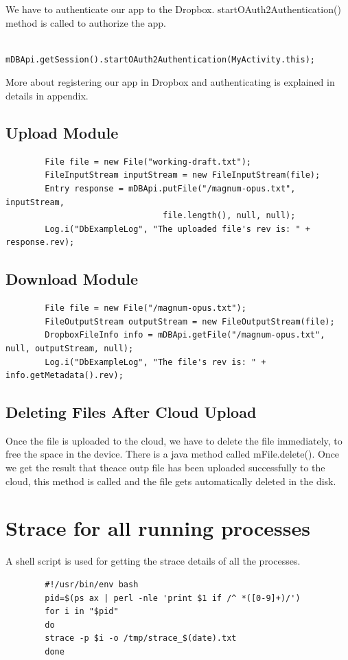 \documentclass[12pt]{report}
\begin{document}
We have to authenticate our app to the Dropbox. startOAuth2Authentication() method is called to authorize the app.

\begin{lstlisting}
        mDBApi.getSession().startOAuth2Authentication(MyActivity.this);
\end{lstlisting}

More about registering our app in Dropbox and authenticating is explained in details in appendix.
\subsection{Upload Module}

\begin{lstlisting}
        File file = new File("working-draft.txt");
        FileInputStream inputStream = new FileInputStream(file);
        Entry response = mDBApi.putFile("/magnum-opus.txt", inputStream,
                                file.length(), null, null);
        Log.i("DbExampleLog", "The uploaded file's rev is: " + response.rev);

\end{lstlisting}
\subsection{Download Module}
\begin{lstlisting}
        File file = new File("/magnum-opus.txt");
        FileOutputStream outputStream = new FileOutputStream(file);
        DropboxFileInfo info = mDBApi.getFile("/magnum-opus.txt", null, outputStream, null);
        Log.i("DbExampleLog", "The file's rev is: " + info.getMetadata().rev);
\end{lstlisting}

\subsection{Deleting Files After Cloud Upload}
Once the file is uploaded to the cloud, we have to delete the file immediately, to free the space in the device.
There is a java method called mFile.delete(). Once we get the result that theace outp file has been uploaded successfully to the cloud, this method is called and the file gets automatically deleted in the disk. 

\section{Strace for all running processes}
A shell script is used for getting the strace details of all the processes.
\begin{lstlisting}
        #!/usr/bin/env bash
        pid=$(ps ax | perl -nle 'print $1 if /^ *([0-9]+)/')
        for i in "$pid" 
        do
        strace -p $i -o /tmp/strace_$(date).txt  
        done
\end{lstlisting} 
\end{document}
